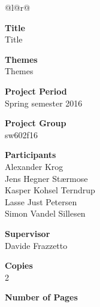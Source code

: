 
\begin{nopagebreak}
{\begin{center}
    \begin{tabular*}{\textwidth}{@{}l@{\extracolsep{\fill}}r@{}}
        \\
        \begin{minipage}[t]{0.3\textwidth}
            \textbf{Title}\\
            Title
            
            \bigskip
            \textbf{Themes}\\
            Themes

            \bigskip
            \textbf{Project Period}\\
            Spring semester 2016

            \bigskip
            \textbf{Project Group}\\
            sw602f16

            \bigskip
            \textbf{Participants}\\
            Alexander Krog\\
            Jens Hegner Stærmose\\
            Kasper Kohsel Terndrup\\
            Lasse Just Petersen\\
            Simon Vandel Sillesen
            
            \bigskip
            \textbf{Supervisor}\\
            Davide Frazzetto
            
            \bigskip
            \textbf{Copies}\\
            2 %

            \bigskip
            \textbf{Number of Pages}\\
            \pageref{LastPage}


\end{minipage}
\end{tabular*}
\end{center}}
\end{nopagebreak}
